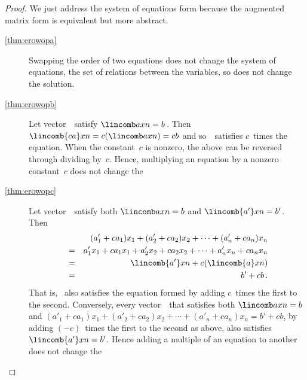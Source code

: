 \begin{proof} 
We just address the system of equations form because the augmented matrix form is equivalent but more abstract.
\begin{description}
\item[\ref{thm:erowopa}] 
Swapping the order of two equations does not change the system of equations, the set of relations between the variables, so does not change the solution.
\item[\ref{thm:erowopb}] 
Let vector~\xv\ satisfy \(\lincomb axn=b\)\,.
Then \(\lincomb{ca}xn=c(\lincomb axn)=cb\) and so~\xv\ satisfies \(c\)~times the equation.
When the constant~\(c\) is nonzero, the above can be reversed through dividing by~\(c\).
Hence, multiplying an equation by a nonzero constant~\(c\) does not change the 

\item[\ref{thm:erowopc}] 
Let vector~\xv\ satisfy both \(\lincomb axn=b\) and \(\lincomb{a'}xn=b'\).
Then
\begin{eqnarray*}
&&(a'_1+ca_1)x_1+(a'_2+ca_2)x_2+\cdots+(a'_n+ca_n)x_n
\\&=&a'_1x_1+ca_1x_1+a'_2x_2+ca_2x_2+\cdots+a'_nx_n+ca_nx_n
\\&=&\lincomb{a'}xn +c(\lincomb{a}xn)
\\&=&b'+cb\,.
\end{eqnarray*}
That is, \xv~also satisfies the equation formed by adding \(c\)~times the first to the second.
Conversely, every vector~\xv\ that satisfies both \(\lincomb axn=b\) and \((a'_1+ca_1)x_1+(a'_2+ca_2)x_2+\cdots+(a'_n+ca_n)x_n=b'+cb\), by adding \((-c)\)~times the first to the second as above, also satisfies \(\lincomb{a'}xn=b'\).
Hence adding a multiple of an equation to another does not change the 

\end{description}
\end{proof}



